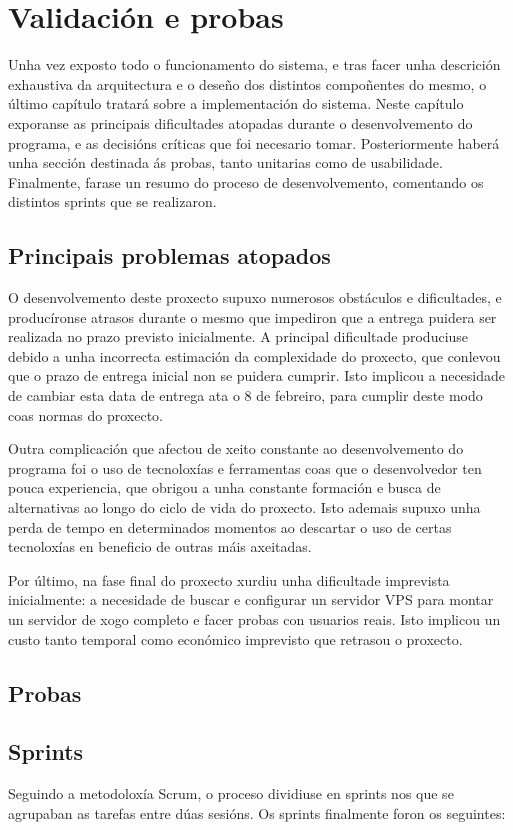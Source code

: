 \chapter{Validación e probas}
\label{ch:implementacion}
Unha vez exposto todo o funcionamento do sistema, e tras facer unha descrición
exhaustiva da arquitectura e o deseño dos distintos compoñentes do mesmo, o
último capítulo tratará sobre a implementación do sistema. Neste capítulo
exporanse as principais dificultades atopadas durante o desenvolvemento do
programa, e as decisións críticas que foi necesario tomar. Posteriormente haberá
unha sección destinada ás probas, tanto unitarias como de usabilidade.
Finalmente, farase un resumo do proceso de desenvolvemento, comentando os
distintos sprints que se realizaron.

\section{Principais problemas atopados}
O desenvolvemento deste proxecto supuxo numerosos obstáculos e dificultades, e
producíronse atrasos durante o mesmo que impediron que a entrega puidera ser
realizada no prazo previsto inicialmente. A principal dificultade produciuse
debido a unha incorrecta estimación da complexidade do proxecto, que conlevou
que o prazo de entrega inicial non se puidera cumprir. Isto implicou a
necesidade de cambiar esta data de entrega ata o 8 de febreiro, para cumplir
deste modo coas normas do proxecto.
\par
Outra complicación que afectou de xeito constante ao desenvolvemento do
programa foi o uso de tecnoloxías e ferramentas coas que o desenvolvedor ten
pouca experiencia, que obrigou a unha constante formación e busca de
alternativas ao longo do ciclo de vida do proxecto. Isto ademais supuxo unha
perda de tempo en determinados momentos ao descartar o uso de certas tecnoloxías
en beneficio de outras máis axeitadas.
\par
Por último, na fase final do proxecto xurdiu unha dificultade imprevista
inicialmente: a necesidade de buscar e configurar un servidor VPS para montar un
servidor de xogo completo e facer probas con usuarios reais. Isto implicou un
custo tanto temporal como económico imprevisto que retrasou o proxecto.

\section{Probas}

\section{Sprints}
Seguindo a metodoloxía Scrum, o proceso dividiuse en sprints nos que se
agrupaban as tarefas entre dúas sesións. Os sprints finalmente foron os
seguintes:
